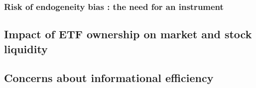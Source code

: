 \subsubsection{Risk of endogeneity bias : the need for an instrument}
\subsection{Impact of ETF ownership on market and stock liquidity}
\label{subsec:Method:Liquidity}
\subsection{Concerns about informational efficiency}
